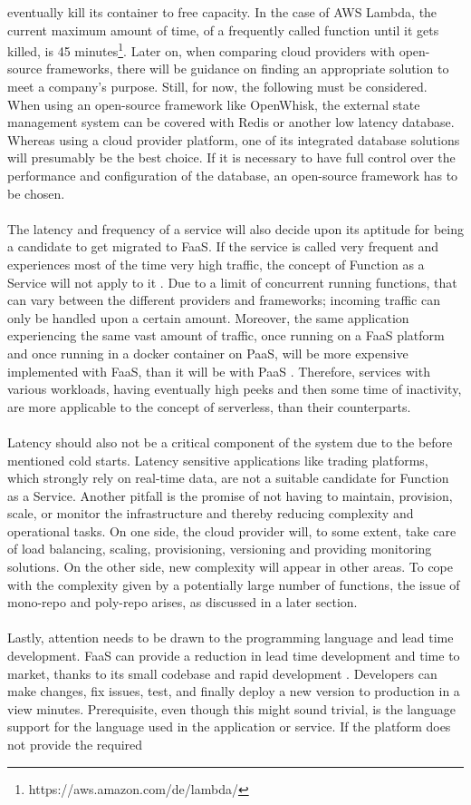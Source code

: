 \documentclass[11pt]{article}
\begin{document}
eventually kill its container to free capacity. In the case of AWS Lambda, the current maximum amount of time, of a frequently called function until it gets killed, is 45 minutes\footnote{https://aws.amazon.com/de/lambda/}. Later on, when comparing cloud providers with open-source frameworks, there will be guidance on finding an appropriate solution to meet a company's purpose. Still, for now, the following must be considered. When using an open-source framework like OpenWhisk, the external state management system can be covered with Redis or another low latency database. Whereas using a cloud provider platform, one of its integrated database solutions will presumably be the best choice. If it is necessary to have full control over the performance and configuration of the database, an open-source framework has to be chosen.\\\\ The latency and frequency of a service will also decide upon its aptitude for being a candidate to get migrated to FaaS. If the service is called very frequent and experiences most of the time very high traffic, the concept of Function as a Service will not apply to it \cite{jonas2019cloud}. Due to a limit of concurrent running functions, that can vary between the different providers and frameworks; incoming traffic can only be handled upon a certain amount. Moreover, the same application experiencing the same vast amount of traffic, once running on a FaaS platform and once running in a docker container on PaaS, will be more expensive implemented with FaaS, than it will be with PaaS \cite{jonas2019cloud}. Therefore, services with various workloads, having eventually high peeks and then some time of inactivity, are more applicable to the concept of serverless, than their counterparts.\\\\ Latency should also not be a critical component of the system due to the before mentioned cold starts. Latency sensitive applications like trading platforms, which strongly rely on real-time data, are not a suitable candidate for Function as a Service. Another pitfall is the promise of not having to maintain, provision, scale, or monitor the infrastructure and thereby reducing complexity and operational tasks. On one side, the cloud provider will, to some extent, take care of load balancing, scaling, provisioning, versioning and providing monitoring solutions. On the other side, new complexity will appear in other areas. To cope with the complexity given by a potentially large number of functions, the issue of mono-repo and poly-repo arises, as discussed in a later section.\\\\ Lastly, attention needs to be drawn to the programming language and lead time development. FaaS can provide a reduction in lead time development and time to market, thanks to its small codebase and rapid development \cite{sewak2018winning} \cite{leitner2019mixed}. Developers can make changes, fix issues, test, and finally deploy a new version to production in a view minutes. Prerequisite, even though this might sound trivial, is the language support for the language used in the application or service. If the platform does not provide the required 
\end{document}
